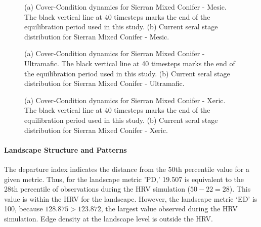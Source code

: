 \begin{figure}[!htbp]
  \centering
  \caption{(a) Cover-Condition dynamics for Sierran Mixed Conifer - Mesic. The black vertical line at 40 timesteps marks the end of the equilibration period used in this study. (b) Current seral stage distribution for Sierran Mixed Conifer - Mesic.} 
  \label{fig:covcond_smcm}
\end{figure}

\begin{figure}[!htbp]
  \centering
  \caption{(a) Cover-Condition dynamics for Sierran Mixed Conifer - Ultramafic. The black vertical line at 40 timesteps marks the end of the equilibration period used in this study. (b) Current seral stage distribution for Sierran Mixed Conifer - Ultramafic.} 
  \label{fig:covcond_smcu}
\end{figure}

\begin{figure}[!htbp]
  \centering
  \caption{(a) Cover-Condition dynamics for Sierran Mixed Conifer - Xeric. The black vertical line at 40 timesteps marks the end of the equilibration period used in this study. (b) Current seral stage distribution for Sierran Mixed Conifer - Xeric.} 
  \label{fig:covcond_smcx}
\end{figure}


\paragraph{Landscape Structure and Patterns}

The departure index indicates the distance from the 50th percentile value for a given metric. Thus, for the landscape metric 'PD,' 19.507 is equivalent to the 28th percentile of observations during the HRV simulation ($50-22 = 28$). This value is within the HRV for the landscape. However, the landscape metric `ED' is 100, because $128.875 > 123.872$, the largest value observed during the HRV simulation. Edge density at the landscape level is outside the HRV.


